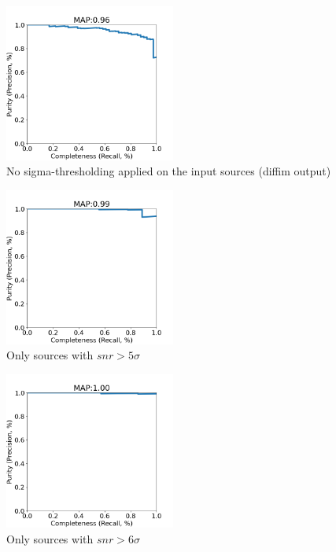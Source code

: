 \documentclass[DM,authoryear,toc]{lsstdoc}
\begin{document}
\begin{figure}[h]
  \centering
  \includegraphics[width=0.5\textwidth]{precrec___checkpoint_epoch0000087_0200000____rbdata_data_npy_data_gt1M___posw_30.png}
  \caption{No sigma-thresholding applied on the input sources (diffim output)}
  \label{fig:tract_templates}
\end{figure}

\begin{figure}[h]
  \centering
  \includegraphics[width=0.5\textwidth]{precrec___checkpoint_epoch0000087_0200000____rbdata_data_npy_data_gt1M-5sigma___posw_30.png}
  \caption{Only sources with $snr > 5\sigma$}
  \label{fig:tract_templates}
\end{figure}

\begin{figure}[h]
  \centering
  \includegraphics[width=0.5\textwidth]{precrec___checkpoint_epoch0000087_0200000____rbdata_data_npy_data_gt1M-6sigma___posw_30.png}
  \caption{Only sources with $snr > 6\sigma$}
  \label{fig:tract_templates}
\end{figure}
\end{document}
